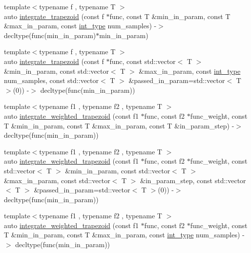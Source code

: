 \begin{DoxyCompactItemize}
\item 
{\footnotesize template$<$typename f , typename T $>$ }\\auto \hyperlink{namespaceIceBRG_afc7d31efdf2b166573350a9e693bf3a4}{integrate\+\_\+trapezoid} (const f $\ast$func, const T \&min\+\_\+in\+\_\+param, const T \&max\+\_\+in\+\_\+param, const \hyperlink{lib_2IceBRG__main_2common_8h_ac4de9d9335536ac22821171deec8d39e}{int\+\_\+type} num\+\_\+samples) -\/$>$ decltype(func(min\+\_\+in\+\_\+param)$\ast$min\+\_\+in\+\_\+param)
\item 
{\footnotesize template$<$typename f , typename T $>$ }\\auto \hyperlink{namespaceIceBRG_a53f412a68158389ebc34e1fb5c1780f6}{integrate\+\_\+trapezoid} (const f $\ast$func, const std\+::vector$<$ T $>$ \&min\+\_\+in\+\_\+param, const std\+::vector$<$ T $>$ \&max\+\_\+in\+\_\+param, const \hyperlink{lib_2IceBRG__main_2common_8h_ac4de9d9335536ac22821171deec8d39e}{int\+\_\+type} num\+\_\+samples, const std\+::vector$<$ T $>$ \&passed\+\_\+in\+\_\+param=std\+::vector$<$ T $>$(0)) -\/$>$ decltype(func(min\+\_\+in\+\_\+param))
\item 
{\footnotesize template$<$typename f1 , typename f2 , typename T $>$ }\\auto \hyperlink{namespaceIceBRG_aa592fc52ca60397e4db7bab2d89761cb}{integrate\+\_\+weighted\+\_\+trapezoid} (const f1 $\ast$func, const f2 $\ast$func\+\_\+weight, const T \&min\+\_\+in\+\_\+param, const T \&max\+\_\+in\+\_\+param, const T \&in\+\_\+param\+\_\+step) -\/$>$ decltype(func(min\+\_\+in\+\_\+param))
\item 
{\footnotesize template$<$typename f1 , typename f2 , typename T $>$ }\\auto \hyperlink{namespaceIceBRG_ad6ad20d58c1f14090f5bd1f856555844}{integrate\+\_\+weighted\+\_\+trapezoid} (const f1 $\ast$func, const f2 $\ast$func\+\_\+weight, const std\+::vector$<$ T $>$ \&min\+\_\+in\+\_\+param, const std\+::vector$<$ T $>$ \&max\+\_\+in\+\_\+param, const std\+::vector$<$ T $>$ \&in\+\_\+param\+\_\+step, const std\+::vector$<$ T $>$ \&passed\+\_\+in\+\_\+param=std\+::vector$<$ T $>$(0)) -\/$>$ decltype(func(min\+\_\+in\+\_\+param))
\item 
{\footnotesize template$<$typename f1 , typename f2 , typename T $>$ }\\auto \hyperlink{namespaceIceBRG_a9573270e25c1856fb625a7fa18312c15}{integrate\+\_\+weighted\+\_\+trapezoid} (const f1 $\ast$func, const f2 $\ast$func\+\_\+weight, const T \&min\+\_\+in\+\_\+param, const T \&max\+\_\+in\+\_\+param, const \hyperlink{lib_2IceBRG__main_2common_8h_ac4de9d9335536ac22821171deec8d39e}{int\+\_\+type} num\+\_\+samples) -\/$>$ decltype(func(min\+\_\+in\+\_\+param))

\end{DoxyCompactItemize}
